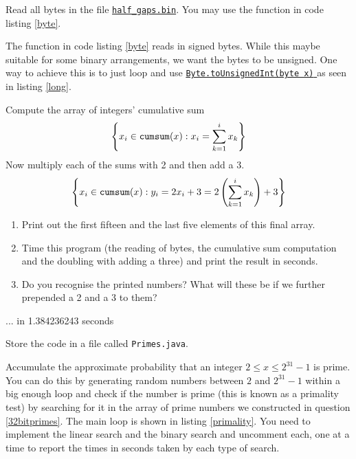 \documentclass{homework}
\newcommand\callit[1]{Store the code in a file called \texttt{#1}.}
\newcommand\docs{\href{%
    https://tinyurl.com/25w2e4wy%
  }{%
    \texttt{Byte.toUnsignedInt(byte x)}%
  }%
}
\begin{document}
\question\label{32bitprimes} Read all bytes in the file
\href{https://tinyurl.com/24bvsnaf}{\texttt{half\_gaps.bin}}. You may
use the function in code listing \ref{byte}.

% 

The function in code listing \ref{byte} reads in signed bytes.
While this maybe suitable for some binary arrangements, we want
the bytes to be unsigned. One way to achieve this is to just loop
and use \docs{} as seen in listing \ref{long}.

% 

Compute the array of integers' cumulative sum \ie
\[
  \left\{x_i \in \mathtt{cumsum}(x) : x_i = \sum_{k=1}^{i} x_k\right\}
\]
Now multiply each of the sums with 2 and then add a 3.
\[
  \left\{x_i \in \mathtt{cumsum}(x) :
    y_i = 2x_i+3 = 2\left(\sum_{k=1}^{i} x_k\right)+3\right\}
\]
\begin{enumerate}
  \item Print out the first fifteen and the last five elements of this
        final array.
  \item Time this program (the reading of bytes, the cumulative sum
        computation and the doubling with adding a three) and print the
        result in seconds.
  \item Do you recognise the printed numbers? What will these be if we
        further prepended a 2 and a 3 to them?
\end{enumerate}

\begin{sol}                  \smallbreak
...      \smallbreak
in 1.384236243 seconds \smallbreak
\end{sol}

\callit{Primes.java}

\question Accumulate the approximate probability that an integer $2 \leq x
  \leq 2^{31}-1$ is prime. You can do this by generating random
numbers between $2$ and $2^{31}-1$ within a big enough loop and
check if the number is prime (this is known as a primality test)
by searching for it in the array of prime numbers we constructed
in
question \ref{32bitprimes}.  The main loop is shown in listing
\ref{primality}.  You need to implement the linear search and the
binary search and uncomment each, one at a time to report the times in
seconds taken by each type of search.
\end{document}
